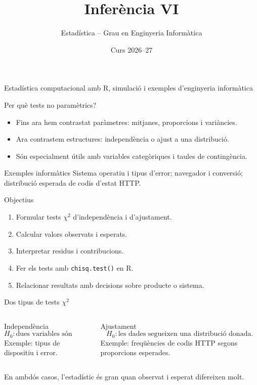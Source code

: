 \documentclass[10pt,aspectratio=169]{beamer}
\title[Inferència VI]{Inferència VI}
\author{Estadística -- Grau en Enginyeria Informàtica}
\date{Curs 2026--27}
\newcommand{\R}{\textsf{R}}
\begin{document}
\begin{frame}[plain]
  \titlepage
  \vspace{-0.45cm}
  \begin{center}
  \small\textcolor{DeepBlue}{Estadística computacional amb \R, simulació i exemples d'enginyeria informàtica}
  \end{center}
\end{frame}


\begin{frame}[fragile]{Per què tests no paramètrics?}
\begin{itemize}
  \item Fins ara hem contrastat paràmetres: mitjanes, proporcions i variàncies.
  \item Ara contrastem estructures: independència o ajust a una distribució.
  \item Són especialment útils amb variables categòriques i taules de contingència.
\end{itemize}
\begin{block}{Exemples informàtics}
Sistema operatiu i tipus d'error; navegador i conversió; distribució esperada de codis d'estat HTTP.
\end{block}
\end{frame}

\begin{frame}[fragile]{Objectius}
\begin{enumerate}
  \item Formular tests $\chi^2$ d'independència i d'ajustament.
  \item Calcular valors observats i esperats.
  \item Interpretar residus i contribucions.
  \item Fer els tests amb \texttt{chisq.test()} en \R.
  \item Relacionar resultats amb decisions sobre producte o sistema.
\end{enumerate}
\end{frame}

\begin{frame}[fragile]{Dos tipus de tests $\chi^2$}
\begin{columns}[T]
\begin{block}{Independència}
\[
H_0:\text{dues variables són independents.}
\]
Exemple: tipus de dispositiu i error.
\end{block}
\begin{block}{Ajustament}
\[
H_0:\text{les dades segueixen una distribució donada.}
\]
Exemple: freqüències de codis HTTP segons proporcions esperades.
\end{block}
\end{columns}
\vspace{0.3cm}
En ambdós casos, l'estadístic és gran quan observat i esperat difereixen molt.
\end{frame}
\end{document}
